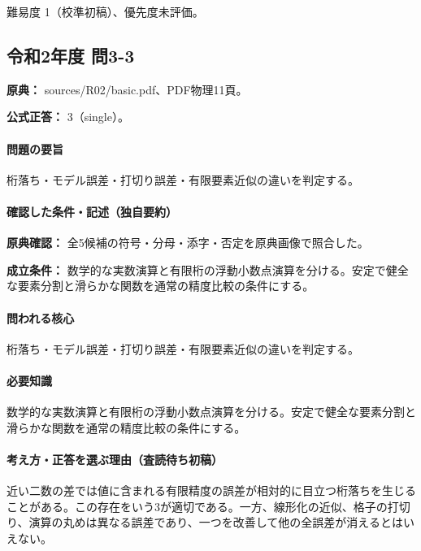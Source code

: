\par 難易度 1（校準初稿）、優先度未評価。

\subsection{令和2年度 問3-3}
\label{q:r02-reg-basic-3-3}

\noindent\textbf{原典：} sources/R02/basic.pdf、PDF物理11頁。

\textbf{公式正答：} 3（single）。

\paragraph{問題の要旨} 桁落ち・モデル誤差・打切り誤差・有限要素近似の違いを判定する。

\paragraph{確認した条件・記述（独自要約）}\mbox{}\par

\noindent\textbf{原典確認：} 全5候補の符号・分母・添字・否定を原典画像で照合した。\par

\noindent\textbf{成立条件：} 数学的な実数演算と有限桁の浮動小数点演算を分ける。安定で健全な要素分割と滑らかな関数を通常の精度比較の条件にする。\par

\paragraph{問われる核心} 桁落ち・モデル誤差・打切り誤差・有限要素近似の違いを判定する。

\paragraph{必要知識} 数学的な実数演算と有限桁の浮動小数点演算を分ける。安定で健全な要素分割と滑らかな関数を通常の精度比較の条件にする。

\paragraph{考え方・正答を選ぶ理由（査読待ち初稿）} 近い二数の差では値に含まれる有限精度の誤差が相対的に目立つ桁落ちを生じることがある。この存在をいう3が適切である。一方、線形化の近似、格子の打切り、演算の丸めは異なる誤差であり、一つを改善して他の全誤差が消えるとはいえない。

